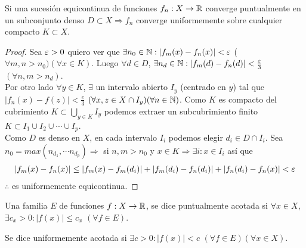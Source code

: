 \begin{theorem}
  Si una sucesión equicontinua de funciones \(f_n: X \to \mathbb{R}\) converge puntualmente en un subconjunto denso \(D \subset X \Rightarrow f_n\) converge uniformemente sobre cualquier compacto \(K \subset X\).

  \begin{proof}
    Sea \(\varepsilon > 0\) quiero ver que \(\exists n_0 \in \mathbb{N} : |f_m(x) - f_n(x)| < \varepsilon\) (\(\forall m, n > n_0)(\forall x \in K)\). Luego \(\forall d \in D\), \(\exists n_d \in \mathbb{N} : |f_m(d) - f_n(d)| < \frac{\varepsilon}{3}\) \((\forall n, m > n_d)\). \\
    Por otro lado \(\forall y \in K\), \(\exists\) un intervalo abierto \(I_y\) (centrado en \(y\)) tal que \(|f_n(x) - f(z)| < \frac{e}{3}\) \((\forall x, z \in X \cap I_y)(\forall n \in \mathbb{N})\). Como \(K\) es compacto del cubrimiento \(K \subset \bigcup_{y \in K} I_y\) podemos extraer un subcubrimiento finito \(K \subset I_1 \cup I_2 \cup \cdots \cup I_p\). \\
    Como \(D\) es denso en \(X\), en cada intervalo \(I_i\) podemos elegir \(d_i \in D \cap I_i\). Sea \(n_0 = max(n_{d_1}, \cdots n_{d_p}) \Rightarrow\) si \(n, m > n_0\) y \(x \in K \Rightarrow \exists i : x \in I_i\) así que \begin{align*}
      |f_m(x) - f_n(x)| \leq |f_m(x) - f_m(d_i)| + |f_m(d_i) - f_n(d_i)| + |f_n(d_i) - f_n(x)| < \varepsilon
    \end{align*} \(\therefore\) es uniformemente equicontinua.
  \end{proof}
\end{theorem}

\begin{definition}
  Una familia \(E\) de funciones \(f: X \to \mathbb{R}\), se dice puntualmente acotada si \(\forall x \in X\), \(\exists c_x > 0 : |f(x)| \leq c_x\) \((\forall f \in E)\).
\end{definition}

\begin{definition}
  Se dice uniformemente acotada si \(\exists c > 0 : |f(x)| < c\) \((\forall f \in E)(\forall x \in X)\).
\end{definition}

\clearpage

